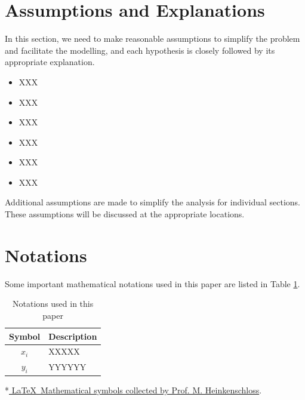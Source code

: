 \documentclass[12pt]{article}  %
\begin{document}
 
 \section{Assumptions and Explanations}
 
 In this section, we need to make reasonable assumptions to simplify the problem and facilitate the modelling, and each hypothesis is closely followed by its appropriate explanation.
 
 \begin{itemize}
     \setlength{\parsep}{0ex} %
     \setlength{\topsep}{2ex} %
     \setlength{\itemsep}{1ex} %
     \item[\bfseries \textit{Assumption} 1:]  XXX
     \item[\bfseries \textit{Explanation:}]  XXX
     \vspace{1ex}
     \item[\bfseries \textit{Assumption} 2:]  XXX
     \item[\bfseries \textit{Explanation:}]  XXX
     \vspace{1ex}
         \item[\bfseries \textit{Assumption} 3:]  XXX
     \item[\bfseries \textit{Explanation:}]  XXX
 \end{itemize}
 
 Additional assumptions are made to simplify the analysis for individual sections. These assumptions will be discussed at the appropriate locations.
 
 \section{Notations}
 Some important mathematical notations used in this paper are listed in Table \ref{tab1}. 
 \begin{table}[htbp]
 \begin{center}
 \caption{Notations used in this paper}
 \begin{tabular}{cl} %
 \toprule[2pt]
 \multicolumn{1}{m{4cm}}{\centering Symbol}
 &\multicolumn{1}{m{10cm}}{\centering Description }\\  %
 \midrule
 $x_i$   & XXXXX \\
 $y_i$   & YYYYYY \\
 \bottomrule[2pt]
 \end{tabular}	\label{tab1} %
  \begin{tablenotes}
         \footnotesize
         \item[*] *\href{https://www.caam.rice.edu/~heinken/latex/symbols.pdf}{ \LaTeX~Mathematical symbols collected by Prof. M. Heinkenschloss}. %
       \end{tablenotes}
 \end{center}
 \end{table} 
 \vspace{-1cm} 
 
\end{document}
